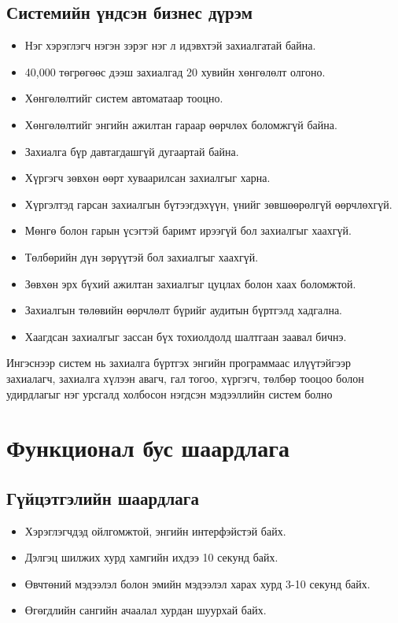 \subsection{Системийн үндсэн бизнес дүрэм}
\begin{itemize}
    \item Нэг хэрэглэгч нэгэн зэрэг нэг л идэвхтэй захиалгатай байна.
    \item 40,000 төгрөгөөс дээш захиалгад 20 хувийн хөнгөлөлт олгоно.
    \item Хөнгөлөлтийг систем автоматаар тооцно.
    \item Хөнгөлөлтийг энгийн ажилтан гараар өөрчлөх боломжгүй байна.
    \item Захиалга бүр давтагдашгүй дугаартай байна.
    \item Хүргэгч зөвхөн өөрт хуваарилсан захиалгыг харна.
    \item Хүргэлтэд гарсан захиалгын бүтээгдэхүүн, үнийг зөвшөөрөлгүй өөрчлөхгүй.
    \item Мөнгө болон гарын үсэгтэй баримт ирээгүй бол захиалгыг хаахгүй.
    \item Төлбөрийн дүн зөрүүтэй бол захиалгыг хаахгүй.
    \item Зөвхөн эрх бүхий ажилтан захиалгыг цуцлах болон хаах боломжтой.
    \item Захиалгын төлөвийн өөрчлөлт бүрийг аудитын бүртгэлд хадгална.
    \item Хаагдсан захиалгыг зассан бүх тохиолдолд шалтгаан заавал бичнэ.
\end{itemize}

Ингэснээр систем нь захиалга бүртгэх энгийн программаас илүүтэйгээр захиалагч, захиалга хүлээн авагч, гал тогоо, хүргэгч, төлбөр тооцоо болон удирдлагыг нэг урсгалд холбосон нэгдсэн мэдээллийн систем болно

\section{Функционал бус шаардлага}

\subsection{Гүйцэтгэлийн шаардлага}
\begin{itemize}
    \item Хэрэглэгчдэд ойлгомжтой, энгийн интерфэйстэй байх.
    \item Дэлгэц шилжих хурд хамгийн ихдээ 10 секунд байх.
    \item Өвчтөний мэдээлэл болон эмийн мэдээлэл харах хурд 3-10 секунд байх.
    \item Өгөгдлийн сангийн ачаалал хурдан шуурхай байх.
\end{itemize}

